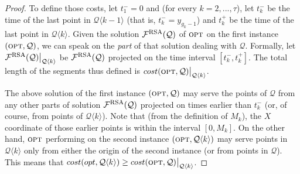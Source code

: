 \documentclass[11pt]{article}
\newcommand{\cost}[0]{cost}
\newcommand{\lrangle}[1]{\langle #1\rangle}
\newcommand{\calF}{\mathcal{F}}
\newcommand{\calQ}{\mathcal{Q}}
\newcommand{\opt}{\mbox{\textsc{opt}}}
\newcommand{\FRSAQ}[0]{\calF^{\mbox{\sc rsa}}(\calQ)}
\begin{document}
{\begin{proof}
To define those costs, let $t_1^-=0$ and (for every $k=2,...,\tau$),
let $t_k^-$ be the time of the last point in $\calQ\lrangle{k-1}$ (that is,
$t_k^-=y_{g_k-1}$) and $t_k^+$ be the time of the last point in $\calQ\lrangle{k}$.
Given the solution $\FRSAQ$ of $\opt$ on the first instance
$(\opt,\calQ)$, we can speak on the {\em part} of that solution
dealing with $\calQ$. Formally,
let
$\FRSAQ \big|_{\calQ\lrangle{k}}$ be
$\FRSAQ$ projected on the time interval $[t_k^-,t_k^+]$.
The total length of the segments thus defined is
$\cost(\opt, \calQ) \big|_{\calQ\lrangle{k}}$.

The above solution of the first instance $(\opt,\calQ)$  may serve the points of $\calQ$ from any other parts of solution $\FRSAQ$ projected on times earlier than $t_k^-$ (or, of course, from points of $\calQ\lrangle{k}$).
Note that (from the definition of $M_k$), the $X$ coordinate of those earlier points is within the interval
$[0,M_k]$.
On the other hand, $\opt$ performing on the second instance $(\opt,\calQ\lrangle{k})$ may serve points in $\calQ\lrangle{k}$ only from either the origin of the second instance (or from points in $\calQ$). This means that
$\cost(opt,\calQ\lrangle{k}) \ge \cost(\opt, \calQ) \big|_{\calQ\lrangle{k}}$.



\end{proof}}
\end{document}
